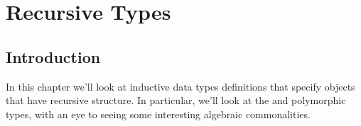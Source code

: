 \documentclass[letterpaper,10pt,english]{sphinxmanual}
\begin{document}
\sphinxstepscope


\chapter{Recursive Types}
\label{\detokenize{A_03_Recursive_Types:recursive-types}}\label{\detokenize{A_03_Recursive_Types:introduction}}\label{\detokenize{A_03_Recursive_Types::doc}}

\section{Introduction}
\label{\detokenize{A_03_Recursive_Types:id1}}
\sphinxAtStartPar
In this chapter we’ll look at inductive data types
definitions that specify objects that have recursive
structure. In particular, we’ll look at the  and
polymorphic  types, with an eye to seeing some
interesting algebraic commonalities.
\end{document}
